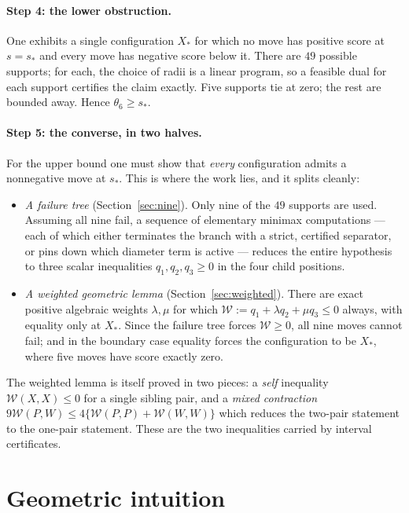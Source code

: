 \documentclass[11pt]{article}
\theoremstyle{plain}
\theoremstyle{definition}
\theoremstyle{remark}
\newcommand{\sstar}{s_{\!*}}
\newcommand{\W}{\mathcal W}
\begin{document}
\paragraph{Step 4: the lower obstruction.}
One exhibits a single configuration $X_*$ for which no move has positive
score at $s=\sstar$ and every move has negative score below it.  There are
$49$ possible supports; for each, the choice of radii is a linear program,
so a feasible dual for each support certifies the claim exactly.  Five
supports tie at zero; the rest are bounded away.  Hence
$\theta_6\ge\sstar$.

\paragraph{Step 5: the converse, in two halves.}
For the upper bound one must show that \emph{every} configuration admits a
nonnegative move at $\sstar$.  This is where the work lies, and it splits
cleanly:

\begin{itemize}
\item \emph{A failure tree} (Section~\ref{sec:nine}).  Only nine of the
      $49$ supports are used.  Assuming all nine fail, a sequence of
      elementary minimax computations --- each of which either terminates
      the branch with a strict, certified separator, or pins down which
      diameter term is active --- reduces the entire hypothesis to three
      scalar inequalities $q_1,q_2,q_3\ge0$ in the four child positions.
\item \emph{A weighted geometric lemma} (Section~\ref{sec:weighted}).
      There are exact positive algebraic weights $\lambda,\mu$ for which
      $\W:=q_1+\lambda q_2+\mu q_3\le0$ always, with equality only at
      $X_*$.  Since the failure tree forces $\W\ge0$, all nine moves cannot
      fail; and in the boundary case equality forces the configuration to
      be $X_*$, where five moves have score exactly zero.
\end{itemize}

The weighted lemma is itself proved in two pieces: a \emph{self}
inequality $\W(X,X)\le0$ for a single sibling pair, and a \emph{mixed
contraction} $9\W(P,W)\le4\{\W(P,P)+\W(W,W)\}$ which reduces the
two-pair statement to the one-pair statement.  These are the two
inequalities carried by interval certificates.

\section{Geometric intuition}\label{sec:intuition}
\end{document}

